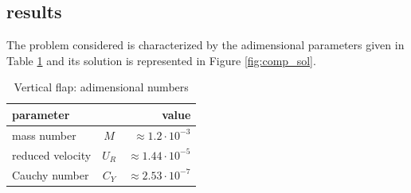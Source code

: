 \subsection{results}

The problem considered is characterized by the adimensional parameters given in Table \ref{table:comp-adim} and its solution is represented in Figure \ref{fig:comp_sol}.


\begin{table}[!h]
	\begin{center}
		\begin{tabular}{ l c | r } 
			parameter & & value   \\ 
			\hline
			mass number  & $M$ & $ \approx 1.2\cdot 10^{-3}$     \\
			reduced velocity & $U_R$ & $ \approx 1.44\cdot 10^{-5}$  \\
			Cauchy number  & $C_Y$ & $  \approx 2.53 \cdot 10^{-7}$  \\			
		\end{tabular}
	\end{center}
	\caption{Vertical flap: adimensional numbers}
	\label{table:comp-adim}
\end{table}

